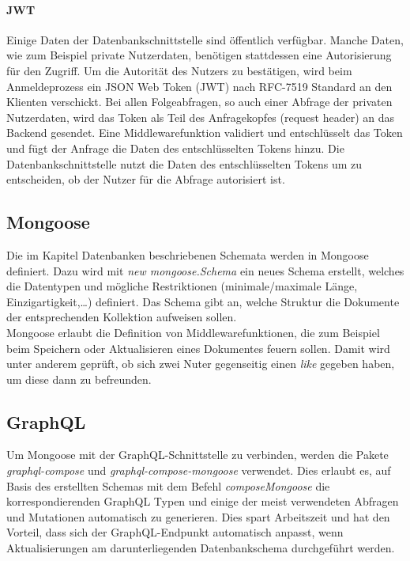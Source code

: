 \paragraph{JWT\\}
Einige Daten der Datenbankschnittstelle sind öffentlich verfügbar.
Manche Daten, wie zum Beispiel private Nutzerdaten, benötigen stattdessen eine Autorisierung für den Zugriff.
Um die Autorität des Nutzers zu bestätigen, wird beim Anmeldeprozess ein JSON Web Token (JWT) nach RFC-7519 Standard an den Klienten verschickt\cite{be:rfc7519}.
Bei allen Folgeabfragen, so auch einer Abfrage der privaten Nutzerdaten, wird das Token als Teil des Anfragekopfes (request header) an das Backend gesendet.
Eine Middlewarefunktion validiert und entschlüsselt das Token und fügt der Anfrage die Daten des entschlüsselten Tokens hinzu.
Die Datenbankschnittstelle nutzt die Daten des entschlüsselten Tokens um zu entscheiden, ob der Nutzer für die Abfrage autorisiert ist.


\subsection{Mongoose}
Die im Kapitel Datenbanken beschriebenen Schemata werden in Mongoose definiert.
Dazu wird mit \textit{new mongoose.Schema} ein neues Schema erstellt, welches die Datentypen und mögliche Restriktionen (minimale/maximale Länge, Einzigartigkeit,\dots) definiert\cite{be:mongooseSchema}.
Das Schema gibt an, welche Struktur die Dokumente der entsprechenden Kollektion aufweisen sollen.\\
Mongoose erlaubt die Definition von Middlewarefunktionen, die zum Beispiel beim Speichern oder Aktualisieren eines Dokumentes feuern sollen\cite{be:mongooseMiddleware}.
Damit wird unter anderem geprüft, ob sich zwei Nuter gegenseitig einen \textit{like} gegeben haben, um diese dann zu befreunden.

\subsection{GraphQL}
Um Mongoose mit der GraphQL-Schnittstelle zu verbinden, werden die Pakete \textit{graphql-compose} und \textit{graphql-compose-mongoose} verwendet.
Dies erlaubt es, auf Basis des erstellten Schemas mit dem Befehl \textit{composeMongoose} die korrespondierenden GraphQL Typen und einige der meist verwendeten Abfragen und Mutationen automatisch zu generieren\cite{be:graphqlComposeMongoose}.
Dies spart Arbeitszeit und hat den Vorteil, dass sich der GraphQL-Endpunkt automatisch anpasst, wenn Aktualisierungen am darunterliegenden Datenbankschema durchgeführt werden.